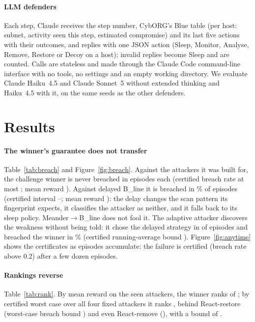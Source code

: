 \documentclass[conference,compsoc]{IEEEtran}
\begin{document}
\paragraph{LLM defenders}
Each step, Claude receives the step number, CybORG's Blue table (per host: subnet,
activity seen this step, estimated compromise) and its last five actions with their
outcomes, and replies with one JSON action (Sleep, Monitor, Analyse, Remove, Restore or
Decoy on a host); invalid replies become Sleep and are counted. Calls are stateless and
made through the Claude Code command-line interface with no tools, no settings and an
empty working directory. We evaluate Claude Haiku~4.5 and Claude Sonnet~5 without
extended thinking and Haiku~4.5 with it, on the same seeds as the other defenders.

\section{Results}\label{sec:results}
\paragraph{The winner's guarantee does not transfer}
Table~\ref{tab:breach} and Figure~\ref{fig:breach}. Against the attackers it was built
for, the challenge winner is never breached in \CgEpisodes{} episodes each (certified
breach rate at most \CgChampSeenBreachUp; mean reward \CgChampSeenReward). Against
delayed B\_line it is breached in \CgChampDelayedBreach\% of episodes (certified
interval \CgChampDelayedLow--\CgChampDelayedUp; mean reward \CgChampDelayedReward):
the delay changes the scan pattern its fingerprint expects, it classifies the attacker as
neither, and it falls back to its sleep policy. Meander$\to$B\_line does not fool it.
The adaptive attacker discovers the weakness without being told: it chose the delayed
strategy in \CgChampAdaptDelayed{} of \CgEpisodes{} episodes and breached the winner in
\CgChampAdaptBreach\% (certified running-average bound \CgChampAdaptUp).
Figure~\ref{fig:anytime} shows the certificates as episodes accumulate: the failure is
certified (breach rate above 0.2) after a few dozen episodes.

\paragraph{Rankings reverse}
Table~\ref{tab:rank}. By mean reward on the seen attackers, the winner ranks
\CgChampRankMean{} of \CgDefenders; by certified worst case over all four fixed attackers it
ranks \CgChampRankCert{}, behind React-restore (worst-case breach bound
\CgRestoreAllBreachCert) and even React-remove (\CgRemoveAllBreachCert), with a bound of
\CgChampAllBreachCert.
\end{document}

